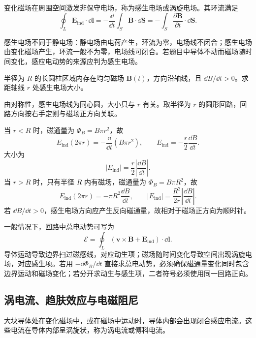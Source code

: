 \begin{definition}[感生电场]\label{def:induced-electric-field}
变化磁场在周围空间激发非保守电场，称为感生电场或涡旋电场。其环流满足
\[
  \oint_L \bm E_{\mathrm{ind}}\cdot\dd\bm l
  =-\frac{\dd}{\dd t}\int_S\bm B\cdot\dd\bm S
  =-\int_S\frac{\partial \bm B}{\partial t}\cdot\dd\bm S.
\]
\end{definition}

感生电场不同于静电场：静电场由电荷产生，环流为零，电场线不闭合；感生电场由变化磁场产生，环流一般不为零，电场线可闭合。若题目中导体不动而磁场随时间变化，感应电动势的来源应判为感生电场。

\begin{example}[title={均匀变化磁场中的感生电场}]\label{eg:induced-E-cylinder}
半径为 $R$ 的长圆柱区域内存在均匀磁场 $\bm B(t)$，方向沿轴线，且 $\dd B/\dd t>0$。求距轴线 $r$ 处感生电场大小。
\begin{solution}
由对称性，感生电场线为同心圆，大小只与 $r$ 有关。取半径为 $r$ 的圆形回路，回路方向按右手定则与磁场正方向关联。

当 $r<R$ 时，磁通量为 $\Phi_B=B\pi r^2$，故
\[
  E_{\mathrm{ind}}(2\pi r)=-\frac{\dd}{\dd t}(B\pi r^2),
  \qquad
  E_{\mathrm{ind}}=-\frac{r}{2}\frac{\dd B}{\dd t}.
\]
大小为
\[
  |E_{\mathrm{ind}}|=\frac{r}{2}\left|\frac{\dd B}{\dd t}\right|.
\]
当 $r>R$ 时，只有半径 $R$ 内有磁场，磁通量为 $\Phi_B=B\pi R^2$，故
\[
  E_{\mathrm{ind}}(2\pi r)=-\pi R^2\frac{\dd B}{\dd t},
  \qquad
  |E_{\mathrm{ind}}|=\frac{R^2}{2r}\left|\frac{\dd B}{\dd t}\right|.
\]
若 $\dd B/\dd t>0$，感生电场方向应产生反向磁通量，故相对于磁场正方向为顺时针。
\end{solution}
\end{example}

\begin{method}[动生与感生同时存在时的处理]
一般情况下，回路中总电动势可写为
\[
  \mathcal E=\oint_L(\bm v\times\bm B+\bm E_{\mathrm{ind}})\cdot\dd\bm l.
\]
导体运动导致边界扫过磁感线，对应动生项；磁场随时间变化导致空间出现涡旋电场，对应感生项。若用 $-\dd\Phi_B/\dd t$ 直接求总电动势，必须确保磁通量变化同时包含边界运动和磁场变化；若分开求动生与感生项，二者符号必须使用同一回路正向。
\end{method}

\subsection{涡电流、趋肤效应与电磁阻尼}

\begin{definition}[涡电流]\label{def:eddy-current}
大块导体处在变化磁场中，或在磁场中运动时，导体内部会出现闭合感应电流。这些电流在导体内部呈涡旋状，称为涡电流或傅科电流。
\end{definition}

